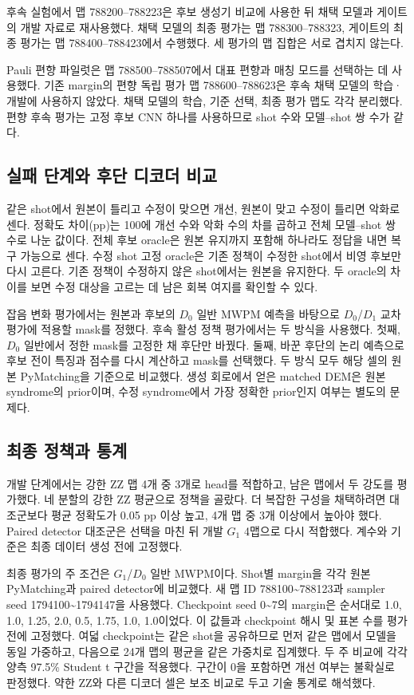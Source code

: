 \documentclass[aps,prd,12pt,twocolumn,superscriptaddress,floatfix]{revtex4-2}
\begin{document}
후속 실험에서 맵 788200--788223은 후보 생성기 비교에 사용한 뒤 채택 모델과 게이트의 개발 자료로 재사용했다. 채택 모델의 최종 평가는 맵 788300--788323, 게이트의 최종 평가는 맵 788400--788423에서 수행했다. 세 평가의 맵 집합은 서로 겹치지 않는다.

Pauli 편향 파일럿은 맵 788500--788507에서 대표 편향과 매칭 모드를 선택하는 데 사용했다. 기존 margin의 편향 독립 평가 맵 788600--788623은 후속 채택 모델의 학습·개발에 사용하지 않았다. 채택 모델의 학습, 기준 선택, 최종 평가 맵도 각각 분리했다. 편향 후속 평가는 고정 후보 CNN 하나를 사용하므로 shot 수와 모델--shot 쌍 수가 같다.

\subsection{실패 단계와 후단 디코더 비교}

같은 shot에서 원본이 틀리고 수정이 맞으면 개선, 원본이 맞고 수정이 틀리면 악화로 센다. 정확도 차이(pp)는 100에 개선 수와 악화 수의 차를 곱하고 전체 모델--shot 쌍 수로 나눈 값이다. 전체 후보 oracle은 원본 유지까지 포함해 하나라도 정답을 내면 복구 가능으로 센다. 수정 shot 고정 oracle은 기존 정책이 수정한 shot에서 비영 후보만 다시 고른다. 기존 정책이 수정하지 않은 shot에서는 원본을 유지한다. 두 oracle의 차이를 보면 수정 대상을 고르는 데 남은 회복 여지를 확인할 수 있다.

잡음 변화 평가에서는 원본과 후보의 \(D_0\) 일반 MWPM 예측을 바탕으로 \(D_0\)/\(D_1\) 교차 평가에 적용할 mask를 정했다. 후속 활성 정책 평가에서는 두 방식을 사용했다. 첫째, \(D_0\) 일반에서 정한 mask를 고정한 채 후단만 바꿨다. 둘째, 바꾼 후단의 논리 예측으로 후보 전이 특징과 점수를 다시 계산하고 mask를 선택했다. 두 방식 모두 해당 셀의 원본 PyMatching을 기준으로 비교했다. 생성 회로에서 얻은 matched DEM은 원본 syndrome의 prior이며, 수정 syndrome에서 가장 정확한 prior인지 여부는 별도의 문제다.

\subsection{최종 정책과 통계}

개발 단계에서는 강한 ZZ 맵 4개 중 3개로 head를 적합하고, 남은 맵에서 두 강도를 평가했다. 네 분할의 강한 ZZ 평균으로 정책을 골랐다. 더 복잡한 구성을 채택하려면 대조군보다 평균 정확도가 0.05 pp 이상 높고, 4개 맵 중 3개 이상에서 높아야 했다. Paired detector 대조군은 선택을 마친 뒤 개발 \(G_1\) 4맵으로 다시 적합했다. 계수와 기준은 최종 데이터 생성 전에 고정했다.

최종 평가의 주 조건은 \(G_1\)/\(D_0\) 일반 MWPM이다. Shot별 margin을 각각 원본 PyMatching과 paired detector에 비교했다. 새 맵 ID 788100\textasciitilde{}788123과 sampler seed 1794100\textasciitilde{}1794147을 사용했다. Checkpoint seed 0\textasciitilde{}7의 margin은 순서대로 1.0, 1.0, 1.25, 2.0, 0.5, 1.75, 1.0, 1.0이었다. 이 값들과 checkpoint 해시 및 표본 수를 평가 전에 고정했다. 여덟 checkpoint는 같은 shot을 공유하므로 먼저 같은 맵에서 모델을 동일 가중하고, 다음으로 24개 맵의 평균을 같은 가중치로 집계했다. 두 주 비교에 각각 양측 97.5\% Student t 구간을 적용했다. 구간이 0을 포함하면 개선 여부는 불확실로 판정했다. 약한 ZZ와 다른 디코더 셀은 보조 비교로 두고 기술 통계로 해석했다.
\end{document}
